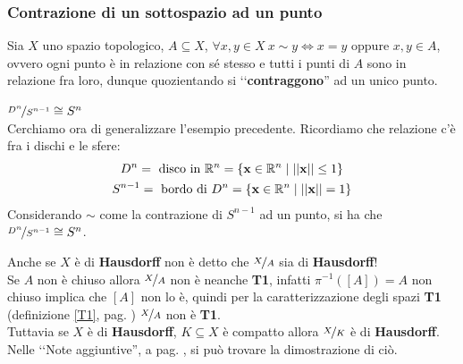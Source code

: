 \subsubsection{Contrazione di un sottospazio ad un punto}
Sia $X$ uno spazio topologico, $A\subseteq X$, $\forall x,y\in X \ x\sim y\iff x=y$ oppure $x,y\in A$, ovvero ogni punto è in relazione con sé stesso e tutti i punti di $A$ sono in relazione fra loro, dunque quozientando si ‘‘\textbf{contraggono}'' ad un unico punto.
\begin{example} $\nicefrac{D^n}{S^{n-1}}\cong S^n$ \\
	Cerchiamo ora di generalizzare l'esempio precedente. Ricordiamo che relazione c'è fra i dischi e le sfere:
		\begin{gather*}
			D^n=\text{ disco in } \mathbb{R}^n=\{\mathbf{x}\in\mathbb{R}^n \mid \left|\left| \mathbf{x} \right|\right| \leq 1 \}\\
			S^{n-1}=\text{ bordo di } D^n=\{\mathbf{x}\in\mathbb{R}^n \mid \left|\left| \mathbf{x} \right|\right| = 1 \}
		\end{gather*}
	Considerando $\sim$ come la contrazione di $S^{n-1}$ ad un punto, si ha che $\nicefrac{D^n}{S^{n-1}} \cong S^n$.
\end{example}

\begin{attention}
	Anche se $X$ è di \textbf{Hausdorff} non è detto che $\nicefrac{X}{A}$ sia di \textbf{Hausdorff}!\\
	Se $A$ non è chiuso allora $\nicefrac{X}{A}$ non è neanche \textbf{T1}, infatti $\pi^{-1}([A])=A$ non chiuso implica che $[A]$ non lo è, quindi per la caratterizzazione degli spazi \textbf{T1} (definizione \ref{T1}, pag. \pageref{T1}) $\nicefrac{X}{A}$ non è \textbf{T1}.\\
	Tuttavia se $X$ è di \textbf{Hausdorff}, $K\subseteq X$ è compatto allora $\nicefrac{X}{K}$ è di \textbf{Hausdorff}. Nelle ‘‘Note aggiuntive'', a pag. \pageref{quozientehausdorffsuspaziocompatto}, si può trovare la dimostrazione di ciò.
\end{attention}
